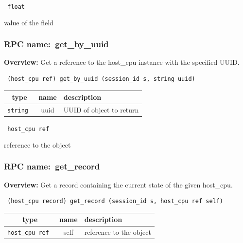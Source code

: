 \vspace{0.3cm}

{\tt 
float
}


value of the field
\vspace{0.3cm}
\vspace{0.3cm}
\vspace{0.3cm}
\subsubsection{RPC name:~get\_by\_uuid}

{\bf Overview:} 
Get a reference to the host\_cpu instance with the specified UUID.

\begin{verbatim} (host_cpu ref) get_by_uuid (session_id s, string uuid)\end{verbatim}



 
\vspace{0.3cm}
\begin{tabular}{|c|c|p{7cm}|}
 \hline
{\bf type} & {\bf name} & {\bf description} \\ \hline
{\tt string } & uuid & UUID of object to return \\ \hline 

\end{tabular}

\vspace{0.3cm}

{\tt 
host\_cpu ref
}


reference to the object
\vspace{0.3cm}
\vspace{0.3cm}
\vspace{0.3cm}
\subsubsection{RPC name:~get\_record}

{\bf Overview:} 
Get a record containing the current state of the given host\_cpu.

\begin{verbatim} (host_cpu record) get_record (session_id s, host_cpu ref self)\end{verbatim}



 
\vspace{0.3cm}
\begin{tabular}{|c|c|p{7cm}|}
 \hline
{\bf type} & {\bf name} & {\bf description} \\ \hline
{\tt host\_cpu ref } & self & reference to the object \\ \hline 

\end{tabular}

